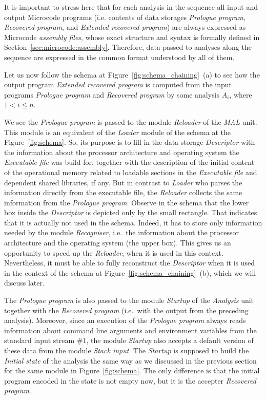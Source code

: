 \documentclass[10pt,twocolumn]{article}
\begin{document}
It is important to stress here that for each analysis in the sequence all input
and output Microcode programs (i.e. contents of data storages \emph{Prologue
program}, \emph{Recovered program}, and \emph{Extended recovered program}) are
always expressed as Microcode \emph{assembly files}, whose exact structure and
syntax is formally defined in Section~\ref{sec:microcode:assembly}. Therefore,
data passed to analyses along the sequence are expressed in the common format
understood by all of them.

Let us now follow the schema at Figure~\ref{fig:schema_chaining}~(a) to see how
the output program \emph{Extended recovered program} is computed from the input
programs \emph{Prologue program} and \emph{Recovered program} by some analysis $
A_i $, where $ 1 < i \leq n $.

We see the \emph{Prologue program} is passed to the module \emph{Reloader} of
the \emph{MAL} unit. This module is an equivalent of the \emph{Loader} module of
the schema at the Figure~\ref{fig:schema}. So, its purpose is to fill in the
data storage \emph{Descriptor} with the information about the processor
architecture and operating system the \emph{Executable file} was build for,
together with the description of the initial content of the operational memory
related to loadable sections in the \emph{Executable file} and dependent shared
libraries, if any. But in contrast to \emph{Loader} who parses the information
directly from the executable file, the \emph{Reloader} collects the same
information from the \emph{Prologue program}. Observe in the schema that the
lower box inside the \emph{Descriptor} is depicted only by the small rectangle.
That indicates that it is actually not used in the schema. Indeed, it has to
store only information needed by the module \emph{Recogniser}, i.e.~the
information about the processor architecture and the operating system (the upper
box). This gives us an opportunity to speed up the \emph{Reloader}, when it is
used in this context. Nevertheless, it must be able to fully reconstruct the
\emph{Descriptor} when it is used in the context of the schema at
Figure~\ref{fig:schema_chaining}~(b), which we will discuss later.

The \emph{Prologue program} is also passed to the module \emph{Startup} of the
\emph{Analysis} unit together with the \emph{Recovered program} (i.e.~with the
output from the preceding analysis). Moreover, since an execution of the
\emph{Prologue program} always reads information about command line arguments
and environment variables from the standard input stream \#1, the module
\emph{Startup} also accepts a default version of these data from the module
\emph{Stack input}. The \emph{Startup} is supposed to build the \emph{Initial
state} of the analysis the same way as we discussed in the previous section for
the same module in Figure~\ref{fig:schema}. The only difference is that the
initial program encoded in the state is not empty now, but it is the accepter
\emph{Recovered program}.
\end{document}
